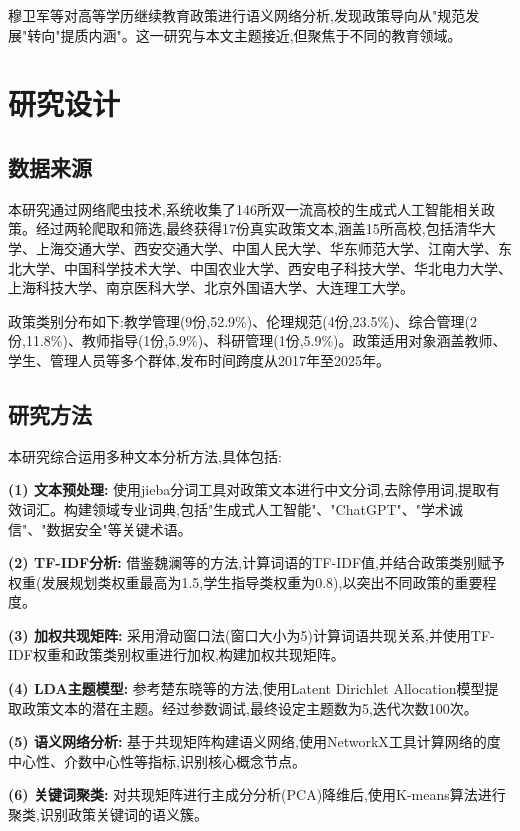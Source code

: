 \documentclass[cn,11pt,chinese]{article}
\begin{document}
穆卫军等\cite{ref10}对高等学历继续教育政策进行语义网络分析,发现政策导向从"规范发展"转向"提质内涵"。这一研究与本文主题接近,但聚焦于不同的教育领域。

\section{研究设计}

\subsection{数据来源}

本研究通过网络爬虫技术,系统收集了146所双一流高校的生成式人工智能相关政策。经过两轮爬取和筛选,最终获得17份真实政策文本,涵盖15所高校,包括清华大学、上海交通大学、西安交通大学、中国人民大学、华东师范大学、江南大学、东北大学、中国科学技术大学、中国农业大学、西安电子科技大学、华北电力大学、上海科技大学、南京医科大学、北京外国语大学、大连理工大学。

政策类别分布如下:教学管理(9份,52.9\%)、伦理规范(4份,23.5\%)、综合管理(2份,11.8\%)、教师指导(1份,5.9\%)、科研管理(1份,5.9\%)。政策适用对象涵盖教师、学生、管理人员等多个群体,发布时间跨度从2017年至2025年。

\subsection{研究方法}

本研究综合运用多种文本分析方法,具体包括:

\textbf{(1) 文本预处理:} 使用jieba分词工具对政策文本进行中文分词,去除停用词,提取有效词汇。构建领域专业词典,包括"生成式人工智能"、"ChatGPT"、"学术诚信"、"数据安全"等关键术语。

\textbf{(2) TF-IDF分析:} 借鉴魏澜等\cite{ref2}的方法,计算词语的TF-IDF值,并结合政策类别赋予权重(发展规划类权重最高为1.5,学生指导类权重为0.8),以突出不同政策的重要程度。

\textbf{(3) 加权共现矩阵:} 采用滑动窗口法(窗口大小为5)计算词语共现关系,并使用TF-IDF权重和政策类别权重进行加权,构建加权共现矩阵\cite{ref2}。

\textbf{(4) LDA主题模型:} 参考楚东晓等\cite{ref9}的方法,使用Latent Dirichlet Allocation模型提取政策文本的潜在主题。经过参数调试,最终设定主题数为5,迭代次数100次。

\textbf{(5) 语义网络分析:} 基于共现矩阵构建语义网络,使用NetworkX工具计算网络的度中心性、介数中心性等指标,识别核心概念节点\cite{ref6,ref10}。

\textbf{(6) 关键词聚类:} 对共现矩阵进行主成分分析(PCA)降维后,使用K-means算法进行聚类,识别政策关键词的语义簇。
\end{document}
